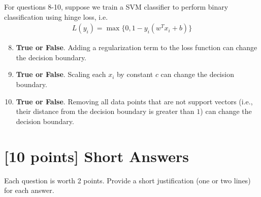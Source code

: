 \documentclass{article}
\newif\ifsolutions
\newenvironment{labelledanswer}{{\bf Answer:} \sf }{}%
\newcommand{\answer}[2]
{{
\ifsolutions
\begin{labelledanswer}
\color{red} 
#2
\end{labelledanswer}
\else
#1
\fi
}}
\begin{document}
\noindent For questions 8-10, suppose we train a SVM classifier to perform binary classification using hinge loss, i.e. 
\begin{align}
    L(y_i) = \max\{0, 1 - y_i (w^T x_i + b)\} 
\end{align}

\begin{enumerate}

\setcounter{enumi}{7}

\item \textbf{True or False}. Adding a regularization term to the loss function can change the decision boundary.

\answer{}{True, just like in class discussion on regularization and the non-separable case, this technique is used to make decision boundary less sensitive to outliers.}

\item \textbf{True or False}. Scaling each $x_i$ by constant $c$ can change the decision boundary.

\answer{}{False, }

\item \textbf{True or False}. Removing all data points that are not support vectors (i.e., their distance from the decision boundary is greater than $1$) can change the decision boundary.

\answer{}{If done before introducing a new training, then True, because SVM would try to recreate the decision boundary using only the leftover points. However, if we mean that after we train, we only save the support vectors, and try to make prediction on a new point, then False, decision boundary remains the same.}

\end{enumerate}

\clearpage

\section{[10 points] Short Answers}

Each question is worth 2 points. Provide a short justification (one or two lines) for each answer.
\end{document}
